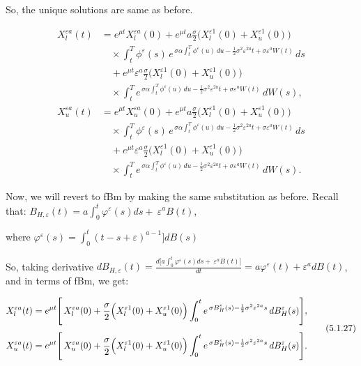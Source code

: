 \documentclass[12pt,a4paper]{report}
\numberwithin{equation}{section}
\begin{document}
So, the unique solutions are same as before.

\[
\begin{aligned}
X_{l}^{\varepsilon a}(t)
&= e^{\mu t}X_{l}^{\varepsilon a}(0)
+ e^{\mu t}a\frac{\sigma}{2}\bigl(X_{l}^{\varepsilon 1}(0)+X_{u}^{\varepsilon 1}(0)\bigr) \\
&\quad \times \int_{t}^{T}\phi^{\varepsilon}(s)\,
e^{\,\sigma\alpha\int_{t}^{T}\phi^{\varepsilon}(u)\,du-\frac{1}{2}\sigma^{2}\varepsilon^{2a}t+\sigma\varepsilon^{a}W(t)}\,ds \\
&\quad + e^{\mu t}\varepsilon^{a}\frac{\sigma}{2}\bigl(X_{l}^{\varepsilon 1}(0)+X_{u}^{\varepsilon 1}(0)\bigr) \\
&\quad \times \int_{t}^{T}
e^{\,\sigma\alpha\int_{t}^{T}\phi^{\varepsilon}(u)\,du-\frac{1}{2}\sigma^{2}\varepsilon^{2a}t+\sigma\varepsilon^{a}W(t)}\,dW(s),\\[6pt]
X_{u}^{\varepsilon a}(t)
&= e^{\mu t}X_{u}^{\varepsilon a}(0)
+ e^{\mu t}a\frac{\sigma}{2}\bigl(X_{l}^{\varepsilon 1}(0)+X_{u}^{\varepsilon 1}(0)\bigr) \\
&\quad \times \int_{t}^{T}\phi^{\varepsilon}(s)\,
e^{\,\sigma\alpha\int_{t}^{T}\phi^{\varepsilon}(u)\,du-\frac{1}{2}\sigma^{2}\varepsilon^{2a}t+\sigma\varepsilon^{a}W(t)}\,ds \\
&\quad + e^{\mu t}\varepsilon^{a}\frac{\sigma}{2}\bigl(X_{l}^{\varepsilon 1}(0)+X_{u}^{\varepsilon 1}(0)\bigr) \\
&\quad \times \int_{t}^{T}
e^{\,\sigma\alpha\int_{t}^{T}\phi^{\varepsilon}(u)\,du-\frac{1}{2}\sigma^{2}\varepsilon^{2a}t+\sigma\varepsilon^{a}W(t)}\,dW(s).
\end{aligned}
\tag{5.1.26}
\]



Now, we will revert to fBm by making the same substitution as before.
Recall that:\emph{\hfill\break
}\(B_{H,\varepsilon}(t) = a\int_{0}^{t}{\varphi^{\varepsilon}(s)ds + \ \varepsilon^{a}B(t)}\),

where
\(\varphi^{\varepsilon}(s) = \int_{0}^{t}{(t - s + \varepsilon)^{a - 1}\rbrack dB(s)}\)

So, taking derivative
\(dB_{H,\varepsilon}(t) = \frac{d\lbrack a\int_{0}^{t}{\varphi^{\varepsilon}(s)ds + \ \varepsilon^{a}B(t)\rbrack}}{dt} = a\varphi^{\varepsilon}(t) + \varepsilon^{a}dB(t)\),
and in terms of fBm, we get:

\[
\begin{aligned}
X_{l}^{\varepsilon a}(t)
&= e^{\mu t}\Bigg[\,X_{l}^{\varepsilon a}(0)
+ \frac{\sigma}{2}\Bigl(X_{l}^{\varepsilon 1}(0)+X_{u}^{\varepsilon 1}(0)\Bigr)
\int_{0}^{t} e^{\,\sigma B_{H}^{\varepsilon}(s)-\frac{1}{2}\sigma^{2}\varepsilon^{2a}s}\,dB_{H}^{\varepsilon}(s)\Bigg],\\[4pt]
X_{u}^{\varepsilon a}(t)
&= e^{\mu t}\Bigg[\,X_{u}^{\varepsilon a}(0)
+ \frac{\sigma}{2}\Bigl(X_{l}^{\varepsilon 1}(0)+X_{u}^{\varepsilon 1}(0)\Bigr)
\int_{0}^{t} e^{\,\sigma B_{H}^{\varepsilon}(s)-\frac{1}{2}\sigma^{2}\varepsilon^{2a}s}\,dB_{H}^{\varepsilon}(s)\Bigg].
\end{aligned}
\tag{5.1.27}
\]
\end{document}
